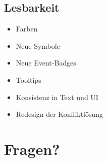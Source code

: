 \documentclass{sdqbeamer}
\begin{document}
\subsection{Lesbarkeit}
\begin{frame}{\insertsubsectionhead}
    \begin{itemize}
        \item Farben
        \item Neue Symbole
        \item Neue Event-Badges
        \item Tooltips
        \item Konsistenz in Text und UI
        \item Redesign der Konfliktlösung
    \end{itemize}
\end{frame}



\section{Fragen?}
\end{document}
